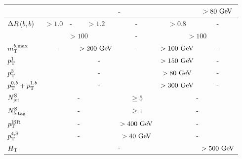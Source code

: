 \begin{landscape}
\begin{table}[htpb]
\begin{center}
\begin{tabular}{lccccccccc}
		       \mantikteightone  &    \multicolumn{8}{c}{-}  & $>80 \gev$  \\ 
		       \midrule
		       $\Delta R\left(b,b\right)$                       & $>1.0$ & \multicolumn{2}{c}{-}& \multicolumn{3}{c}{$>1.2$} & - & $>0.8$ & - \\
		       \mtbmin              & \multicolumn{6}{c}{$>100\,$\gev} & - &  \multicolumn{2}{c}{$>100\,$\gev} \\ 
		       $m_{\mathrm{T}}^{b,\mathrm{max}}$                        & \multicolumn{3}{c}{-}& \multicolumn{3}{c}{$>200\gev$} & - & $>100\gev$ & - \\
		       \midrule
		       $p_{\mathrm{T}}^{1}$                        & \multicolumn{7}{c}{-} & $>150\gev$ & - \\
		       $p_{\mathrm{T}}^{3}$                        & \multicolumn{7}{c}{-} & $>80\gev$ & - \\
		       $p_{\mathrm{T}}^{0,b}+p_{\mathrm{T}}^{1,b}$                        & \multicolumn{7}{c}{-} & $>300\gev$ & - \\
		       \midrule
		       $N_{\mathrm{jet}}^{\mathrm{S}}$         & \multicolumn{6}{c}{-}& $ \ge 5$ & \multicolumn{2}{c}{-} \\
		       $N_{b\textrm{-tag}}^{\mathrm{S}}$         & \multicolumn{6}{c}{-}& $ \ge 1$ & \multicolumn{2}{c}{-} \\
		       $p_{\mathrm{T}}^{\mathrm{ISR}}$         & \multicolumn{6}{c}{-}& $>400\gev$ & \multicolumn{2}{c}{-} \\
		       $p_{\mathrm{T}}^{4,\mathrm{S}}$         & \multicolumn{6}{c}{-}& $>40\gev$ & \multicolumn{2}{c}{-} \\
		       $H_{\mathrm{T}}$         & \multicolumn{8}{c}{-}& $>500\gev$ \\
		       \bottomrule
		    \end{tabular}
		  \end{center}
		  \label{tab:selectionCRTs}
		\end{table}
		\end{landscape}

